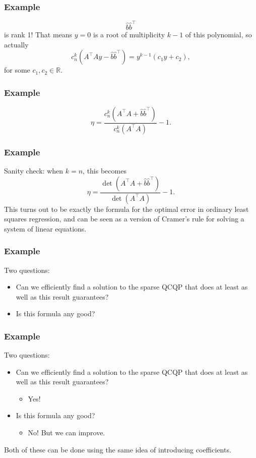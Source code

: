 \documentclass{beamer}
\newcommand{\R}{\mathbb{R}}
\begin{document}
\begin{frame}
    \frametitle{Example}
    \[
        \hat{b}\hat{b}^{\intercal}
    \]
    is rank 1! That means $y = 0$ is a root of multiplicity $k-1$ of this polynomial, so actually
    \[
        c_n^k(A^{\intercal}Ay-\hat{b}\hat{b}^{\intercal}) = y^{k-1}(c_1y+c_2),
    \]
    for some $c_1,c_2 \in \R$.
\end{frame}
\begin{frame}
    \frametitle{Example}
    \[
        \eta = \frac{c_n^k(A^{\intercal}A+\hat{b}\hat{b}^{\intercal})}{c_n^k(A^{\intercal}A)} - 1.
    \]
\end{frame}
\begin{frame}
    \frametitle{Example}
    Sanity check: when $k = n$, this becomes
    \[
        \eta = \frac{\det(A^{\intercal}A+\hat{b}\hat{b}^{\intercal})}{\det(A^{\intercal}A)} - 1.
    \]
    \pause
    This turns out to be exactly the formula for the optimal error in ordinary least squares regression, and can be seen as a version of Cramer's rule for solving a system of linear equations.
\end{frame}
\begin{frame}
    \frametitle{Example}
    Two questions:
    \begin{itemize}
        \item Can we efficiently find a solution to the sparse QCQP that does at least as well as this result guarantees?
        \pause
        \item Is this formula any good?
    \end{itemize}
\end{frame}
\begin{frame}
    \frametitle{Example}
    Two questions:
    \begin{itemize}
        \item Can we efficiently find a solution to the sparse QCQP that does at least as well as this result guarantees?
            \begin{itemize}
                \item Yes!
            \end{itemize}

        \item Is this formula any good?
            \begin{itemize}
                \item No! But we can improve.
            \end{itemize}
    \end{itemize}
    Both of these can be done using the same idea of introducing coefficients.
\end{frame}
\end{document}
